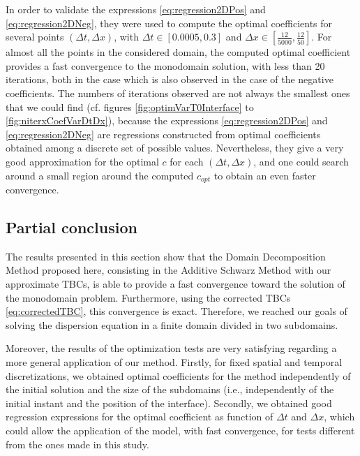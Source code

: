 \indent In order to validate the expressions \eqref{eq:regression2DPos} and \eqref{eq:regression2DNeg}, they were used to compute the optimal coefficients for several points $(\Delta t, \Delta x)$, with $\Delta t \in [0.0005,0.3]$ and $\Delta x \in \left[ \frac{12}{5000},\frac{12}{50} \right]$. For almost all the points in the considered domain, the computed optimal coefficient provides a fast convergence to the monodomain solution, with less than 20 iterations, both in the case which is also observed in the case of the negative coefficients. The numbers of iterations observed are not always the smallest ones that we could find (cf. figures \ref{fig:optimVarT0Interface} to \ref{fig:niterxCoefVarDtDx}), because the expressions \eqref{eq:regression2DPos} and \eqref{eq:regression2DNeg} are regressions constructed from optimal coefficients obtained among a discrete set of possible values. Nevertheless, they give a very good approximation for the optimal $c$ for each $(\Delta t, \Delta x)$, and one could search around a small region around the computed $c_{opt}$ to obtain an even faster convergence.




\subsection{Partial conclusion}
 
\indent The results presented in this section show that the Domain Decomposition Method proposed here, consisting in the Additive Schwarz Method with our approximate TBCs, is able to provide a fast convergence toward the solution of the monodomain problem. Furthermore, using the corrected TBCs \eqref{eq:correctedTBC}, this convergence is exact. Therefore, we reached our goals of solving the dispersion equation in a finite domain divided in two subdomains.

\indent Moreover, the results of the optimization tests are very satisfying regarding a more general application of our method. Firstly, for fixed spatial and temporal discretizations, we obtained optimal coefficients for the method independently of the initial solution and the size of the subdomains (i.e., independently of the initial instant and the position of the interface). Secondly, we obtained good regression expressions for the optimal coefficient as function of $\Delta t$ and $\Delta x$, which could allow the application of the model, with fast convergence, for tests different from the ones made in this study.













